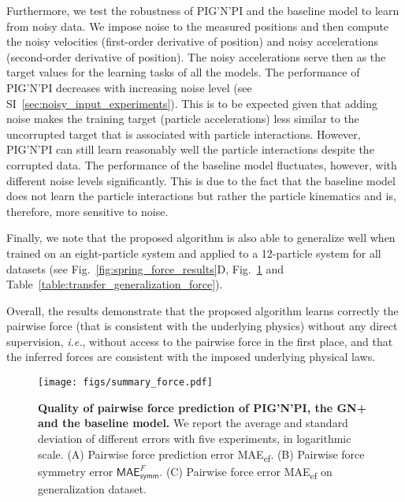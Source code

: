 \documentclass{article}
\newcommand{\pignpi}{PIG'N'PI\xspace}
\newcommand{\lemos}{GN+\xspace}
\newcommand{\APPENDIX}{SI} %
\begin{document}
Furthermore, we test the robustness of \pignpi and the baseline model to learn from noisy data. We impose noise to the measured positions and then compute the noisy velocities (first-order derivative of position) and noisy accelerations (second-order derivative of position). The noisy accelerations serve then as the target values for the learning tasks of all the models. The performance of \pignpi decreases with increasing noise level (see \APPENDIX~\ref{sec:noisy_input_experiments}). This is to be expected given that adding noise makes the training target (particle accelerations) less similar to the uncorrupted target that is associated with particle interactions. However, \pignpi can still learn reasonably well the particle interactions despite the corrupted data. The performance of the baseline model fluctuates, however, with different noise levels significantly. This is due to the fact that the baseline model does not learn the particle interactions but rather the particle kinematics and is, therefore, more sensitive to noise.

Finally, we note that the proposed algorithm is also able to generalize well when trained on an eight-particle system and applied to a 12-particle system for all datasets (see Fig.~\ref{fig:spring_force_results}D, Fig.~\ref{fig:force_summary} and Table~\ref{table:transfer_generalization_force}). 

Overall, the results demonstrate that the proposed algorithm learns correctly the pairwise force (that is consistent with the underlying physics) without any direct supervision, \textit{i.e.}, without access to the pairwise force in the first place, and that the inferred forces are consistent with the imposed underlying physical laws.



\begin{figure}[h!]
    \centering
    \texttt{[image: figs/summary\_force.pdf]}
    \caption{\textbf{Quality of pairwise force prediction of \pignpi, the \lemos and the baseline model.} We report the average and standard deviation of different errors with five experiments, in logarithmic scale. (A) Pairwise force prediction error \textsf{MAE\textsubscript{ef}}. (B) Pairwise force symmetry error $\textsf{MAE}_\textsf{symm}^{F}$. (C) Pairwise force error \textsf{MAE\textsubscript{ef}} on generalization dataset.}
    \label{fig:force_summary}
\end{figure}

\end{document}
